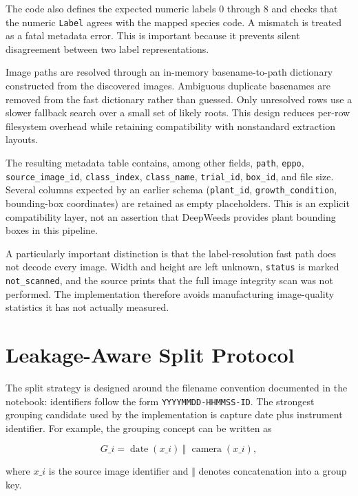\documentclass[11pt,a4paper]{article}
\begin{document}
The code also defines the expected numeric labels 0 through 8 and checks that the numeric \texttt{Label} agrees with the mapped species code. A mismatch is treated as a fatal metadata error. This is important because it prevents silent disagreement between two label representations.

Image paths are resolved through an in-memory basename-to-path dictionary constructed from the discovered images. Ambiguous duplicate basenames are removed from the fast dictionary rather than guessed. Only unresolved rows use a slower fallback search over a small set of likely roots. This design reduces per-row filesystem overhead while retaining compatibility with nonstandard extraction layouts.

The resulting metadata table contains, among other fields, \texttt{path}, \texttt{eppo}, \texttt{source\_image\_id}, \texttt{class\_index}, \texttt{class\_name}, \texttt{trial\_id}, \texttt{box\_id}, and file size. Several columns expected by an earlier schema (\texttt{plant\_id}, \texttt{growth\_condition}, bounding-box coordinates) are retained as empty placeholders. This is an explicit compatibility layer, not an assertion that DeepWeeds provides plant bounding boxes in this pipeline.

A particularly important distinction is that the label-resolution fast path does not decode every image. Width and height are left unknown, \texttt{status} is marked \texttt{not\_scanned}, and the source prints that the full image integrity scan was not performed. The implementation therefore avoids manufacturing image-quality statistics it has not actually measured.

\section{Leakage-Aware Split Protocol}
The split strategy is designed around the filename convention documented in the notebook: identifiers follow the form \texttt{YYYYMMDD-HHMMSS-ID}. The strongest grouping candidate used by the implementation is capture date plus instrument identifier. For example, the grouping concept can be written as

\begin{equation}
G\_i = \operatorname{date}(x\_i)\;\Vert\;\operatorname{camera}(x\_i),
\end{equation}

where $x\_i$ is the source image identifier and $\Vert$ denotes concatenation into a group key.
\end{document}
